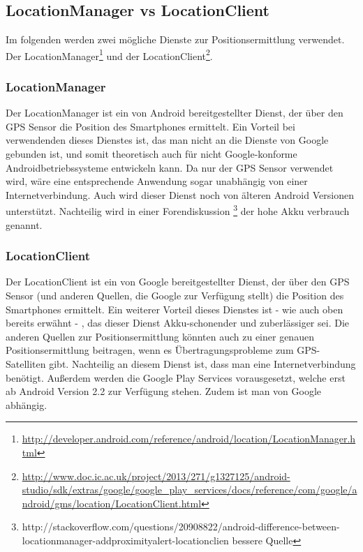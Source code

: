 \subsection{LocationManager vs LocationClient}

Im folgenden werden zwei mögliche Dienste zur Positionsermittlung verwendet. Der LocationManager\footnote{{\url{http://developer.android.com/reference/android/location/LocationManager.html}}} und der LocationClient\footnote{{\url{http://www.doc.ic.ac.uk/project/2013/271/g1327125/android-studio/sdk/extras/google/google_play_services/docs/reference/com/google/android/gms/location/LocationClient.html}}}.


\subsubsection{LocationManager}

Der LocationManager ist ein von Android bereitgestellter Dienst, der über den GPS Sensor die Position des Smartphones ermittelt.
Ein Vorteil bei verwendenden dieses Dienstes ist, das man nicht an die Dienste von Google gebunden ist, und somit theoretisch auch für
nicht Google-konforme Androidbetriebssysteme entwickeln kann. Da nur der GPS Sensor verwendet wird, wäre eine entsprechende Anwendung sogar unabhängig von einer Internetverbindung. Auch wird dieser Dienst noch von älteren Android Versionen unterstützt.
Nachteilig wird in einer Forendiskussion \footnote{http://stackoverflow.com/questions/20908822/android-difference-between-locationmanager-addproximityalert-locationclien {\color{red}}bessere Quelle} der hohe Akku verbrauch genannt.


\subsubsection{LocationClient}

Der LocationClient ist ein von Google bereitgestellter Dienst, der über den GPS Sensor (und anderen Quellen, die Google zur Verfügung stellt) die Position des Smartphones ermittelt. Ein weiterer Vorteil dieses Dienstes ist - wie auch oben bereits erwähnt - , das dieser Dienst Akku-schonender und zuberlässiger sei. Die anderen Quellen zur Positionsermittlung könnten auch zu einer genauen Positionsermittlung beitragen, wenn es Übertragungsprobleme zum GPS-Satelliten gibt.
Nachteilig an diesem Dienst ist, dass man eine Internetverbindung benötigt. Außerdem werden die Google Play Services vorausgesetzt, welche erst ab Android Version 2.2 zur Verfügung stehen. Zudem ist man von Google abhängig.


